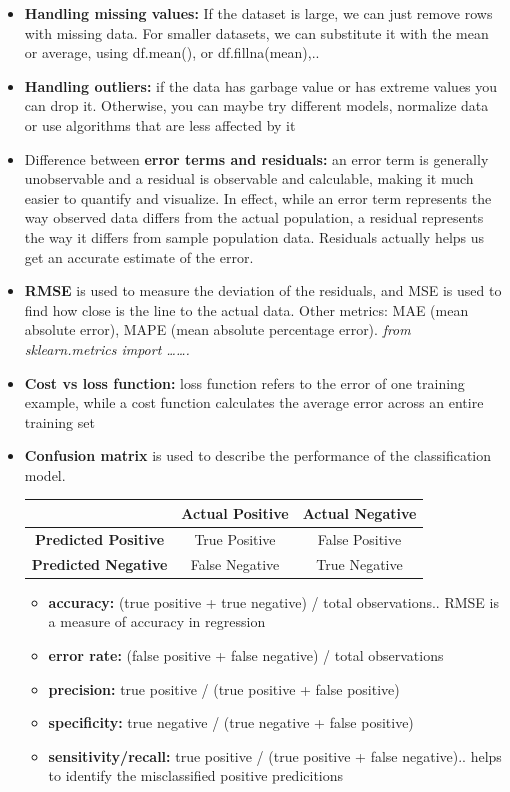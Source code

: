 \documentclass[
  letterpaper,
]{book}
\providecommand{\tightlist}{%
  \setlength{\itemsep}{0pt}\setlength{\parskip}{0pt}}\usepackage{longtable,booktabs,array}
\begin{document}
\hfill\break

\begin{itemize}
\item
  \textbf{Handling missing values:} If the dataset is large, we can just
  remove rows with missing data. For smaller datasets, we can substitute
  it with the mean or average, using df.mean(), or df.fillna(mean),..
\item
  \textbf{Handling outliers:} if the data has garbage value or has
  extreme values you can drop it. Otherwise, you can maybe try different
  models, normalize data or use algorithms that are less affected by it
\item
  Difference between \textbf{error terms and residuals:} an error term
  is generally unobservable and a residual is observable and calculable,
  making it much easier to quantify and visualize. In effect, while an
  error term represents the way observed data differs from the actual
  population, a residual represents the way it differs from sample
  population data. Residuals actually helps us get an accurate estimate
  of the error.
\item
  \textbf{RMSE} is used to measure the deviation of the residuals, and
  MSE is used to find how close is the line to the actual data. Other
  metrics: MAE (mean absolute error), MAPE (mean absolute percentage
  error). \emph{from sklearn.metrics import \ldots\ldots.}
\item
  \textbf{Cost vs loss function:} loss function refers to the error of
  one training example, while a cost function calculates the average
  error across an entire training set
\item
  \textbf{Confusion matrix} is used to describe the performance of the
  classification model.

  \begin{longtable}[]{@{}ccc@{}}
  \toprule\noalign{}
  & Actual Positive & Actual Negative \\
  \midrule\noalign{}
  \endhead
  \bottomrule\noalign{}
  \endlastfoot
  \textbf{Predicted Positive} & True Positive & False Positive \\
  \textbf{Predicted Negative} & False Negative & True Negative \\
  \end{longtable}

  \begin{itemize}
  \tightlist
  \item
    \textbf{accuracy:} (true positive + true negative) / total
    observations.. RMSE is a measure of accuracy in regression
  \item
    \textbf{error rate:} (false positive + false negative) / total
    observations
  \item
    \textbf{precision:} true positive / (true positive + false positive)
  \item
    \textbf{specificity:} true negative / (true negative + false
    positive)
  \item
    \textbf{sensitivity/recall:} true positive / (true positive + false
    negative).. helps to identify the misclassified positive
    predicitions
  \end{itemize}


\end{itemize}
\end{document}
